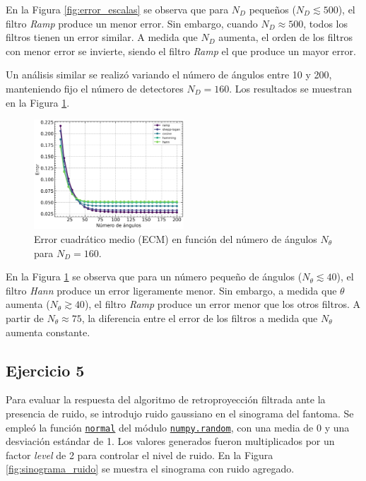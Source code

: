 \documentclass[11pt, twocolumn]{article}
\begin{document}
En la Figura \ref{fig:error_escalas} se observa que para $N_D$ pequeños ($N_D \lesssim 500$), el filtro \textit{Ramp} produce un menor error. Sin embargo, cuando $N_D \approx 500$, todos los filtros tienen un error similar. A medida que $N_D$ aumenta, el orden de los filtros con menor error se invierte, siendo el filtro \textit{Ramp} el que produce un mayor error.

Un análisis similar se realizó variando el número de ángulos entre 10 y 200, manteniendo fijo el número de detectores $N_D = 160$. Los resultados se muestran en la Figura \ref{fig:error_angulos}.

\begin{figure} [htbp]
    \centering
    \includegraphics*[width=0.5\textwidth]{./images/ej_4/angle_error_2.png}
    \caption{Error cuadrático medio (ECM) en función del número de ángulos $N_\theta$ para $N_D = 160$.}
    \label{fig:error_angulos}
\end{figure}

En la Figura \ref{fig:error_angulos} se observa que para un número pequeño de ángulos ($N_\theta \lesssim 40$), el filtro \textit{Hann} produce un error ligeramente menor. Sin embargo, a medida que $\theta$ aumenta ($N_\theta \gtrsim 40$), el filtro \textit{Ramp} produce un error menor que los otros filtros. A partir de $N_\theta \approx 75$, la diferencia entre el error de los filtros a medida que $N_\theta$ aumenta constante.

\subsection*{Ejercicio 5}
Para evaluar la respuesta del algoritmo de retroproyección filtrada ante la presencia de ruido, se introdujo ruido gaussiano en el sinograma del fantoma. Se empleó la función \href{https://numpy.org/doc/stable/reference/random/generated/numpy.random.normal.html}{\texttt{normal}} del módulo \href{https://numpy.org/doc/stable/reference/random/index.html}{\texttt{numpy.random}}, con una media de 0 y una desviación estándar de 1. Los valores generados fueron multiplicados por un factor \textit{level} de 2 para controlar el nivel de ruido. En la Figura \ref{fig:sinograma_ruido} se muestra el sinograma con ruido agregado.
\end{document}
